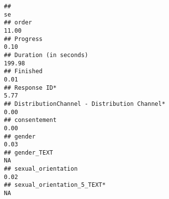 \documentclass[
]{article}
\begin{document}
\begin{verbatim}
##                                                                                                                                                                                                                                se
## order                                                                                                                                                                                                                       11.00
## Progress                                                                                                                                                                                                                     0.10
## Duration (in seconds)                                                                                                                                                                                                      199.98
## Finished                                                                                                                                                                                                                     0.01
## Response ID*                                                                                                                                                                                                                 5.77
## DistributionChannel - Distribution Channel*                                                                                                                                                                                  0.00
## consentement                                                                                                                                                                                                                 0.00
## gender                                                                                                                                                                                                                       0.03
## gender_TEXT                                                                                                                                                                                                                    NA
## sexual_orientation                                                                                                                                                                                                           0.02
## sexual_orientation_5_TEXT*                                                                                                                                                                                                     NA

\end{verbatim}
\end{document}
